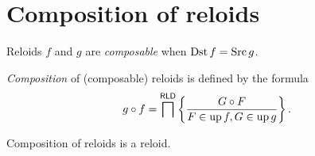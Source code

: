 \section{Composition of reloids}
\begin{defn}
Reloids $f$ and $g$ are \emph{composable}
when $\operatorname{Dst} f=\operatorname{Src} g$.
\end{defn}

\begin{defn}
\emph{Composition} of (composable)
reloids is defined by the formula
\[
g\circ f=\bigsqcap^{\mathsf{RLD}}\left\{ \frac{G\circ F}{F\in\operatorname{up} f,G\in\operatorname{up} g}\right\}.
\]
\end{defn}
\begin{obvious}
Composition of reloids is a reloid.
\end{obvious}


